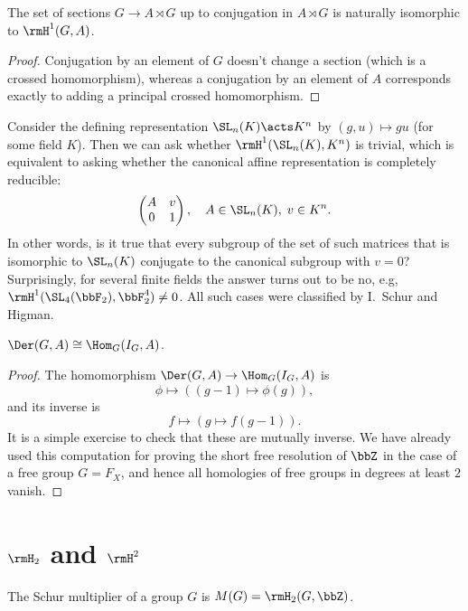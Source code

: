 \begin{cor}
    The set of sections $G\to A\rtimes G$ up to conjugation in $A\rtimes G$ is naturally isomorphic to $\rmH^1(G,A)$.
\end{cor}
\begin{proof}
    Conjugation by an element of $G$ doesn't change a section (which is a crossed homomorphism), whereas a conjugation by an element of $A$ corresponds exactly to adding a principal crossed homomorphism.
\end{proof}

\begin{example}
    Consider the defining representation $\SL_n(K)\acts K^n$ by $(g,u)\mapsto gu$ (for some field $K$). Then we can ask whether $\rmH^1(\SL_n(K),K^n)$ is trivial, which is equivalent to asking whether the canonical affine representation is completely reducible:
    \[\begin{pmatrix}
        A&v\\
        0&1
    \end{pmatrix},\quad A\in \SL_n(K),\;v\in K^n.\]
    In other words, is it true that every subgroup of the set of such matrices that is isomorphic to $\SL_n(K)$ conjugate to the canonical subgroup with $v=0$? Surprisingly, for several finite fields the answer turns out to be no, e.g, $\rmH^1(\SL_4(\bbF_2),\bbF_2^4)\neq 0$. All such cases were classified by I.~Schur and Higman.
\end{example}

\begin{prop}
    $\Der(G,A)\cong \Hom_G(I_G,A)$.
\end{prop}
\begin{proof}
    The homomorphism $\Der(G,A)\to \Hom_G(I_G,A)$ is
    \[\phi\mapsto ((g-1)\mapsto \phi(g)),\]
    and its inverse is
    \[f\mapsto (g\mapsto f(g-1)).\]
    It is a simple exercise to check that these are mutually inverse. We have already used this computation for proving the short free resolution of $\bbZ$ in the case of a free group $G=F_X$, and hence all homologies of free groups in degrees at least $2$ vanish.
\end{proof}

\section{\texorpdfstring{$\rmH_2$}{H2} and \texorpdfstring{$\rmH^2$}{H2}}


\begin{defn}
    The Schur multiplier of a group $G$ is $M(G)=\rmH_2(G,\bbZ)$.
\end{defn}

